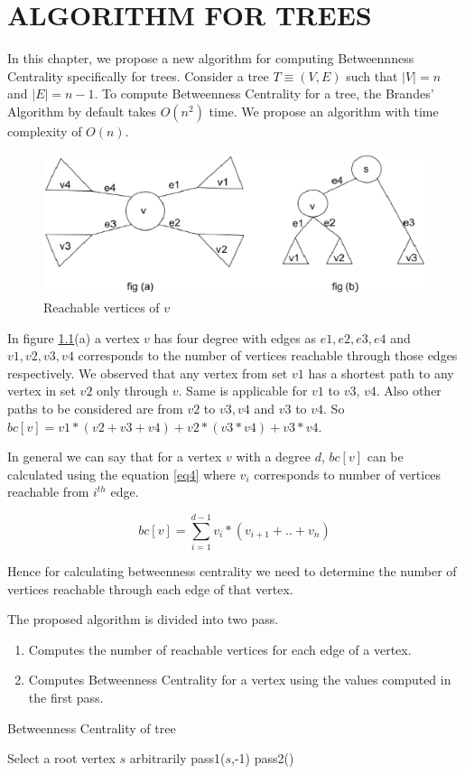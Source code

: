 \chapter{ALGORITHM FOR TREES}
\label{chap:dpp}

In this chapter, we propose a new algorithm for computing Betweennness Centrality specifically for trees. Consider a tree $T \equiv (V,E)$ such that $|V|=n$ and $|E|=n-1$.
To compute Betweenness Centrality for a tree, the Brandes' Algorithm by default takes $O(n^2)$ time.
We propose an algorithm with time complexity of $O(n)$.


\begin{figure}[htp]
\centering
\includegraphics[width=13cm]{images/tree1.eps}
\caption{Reachable vertices of $v$}
\label{fig:lion}
\end{figure}

In figure \ref{fig:lion}(a) a vertex $v$ has four degree with edges as $e1,e2,e3,e4$ and $v1,v2,v3,v4$ corresponds to the number of vertices reachable through those edges respectively. We observed that any vertex from set $v1$ has a shortest path to any vertex in set $v2$ only through $v$. Same is applicable for $v1$ to $v3$, $v4$. Also other paths to be considered are from $v2$ to $v3, v4$ and $v3$ to $v4$.
So $bc[v] = v1*(v2+v3+v4) + v2*(v3*v4) + v3*v4$.

In general we can say that for a vertex $v$ with a degree $d$, $bc[v]$ can be calculated using the equation \ref{eq4} where $v_{i}$ corresponds to number of vertices reachable from $i_{}^{th}$ edge.

\begin{equation} \label{eq4}
bc[v] = \sum_{i=1}^{d-1} v_{i}*(v_{i+1}+..+v_{n})
\end{equation}

Hence for calculating betweenness centrality we need to determine the number of vertices reachable through each edge of that vertex.

The proposed algorithm is divided into two pass.
\vspace{-0.5em}
\begin{enumerate}

  \item Computes the number of reachable vertices for each edge of a vertex.
  \item Computes Betweenness Centrality for a vertex using the values computed in the first pass.
\end{enumerate}
\begin{algorithm}
\caption{Betweenness Centrality of tree}
Select a root vertex $s$ arbitrarily\;
pass1($s$,-1)\;
pass2()\;
\end{algorithm}


